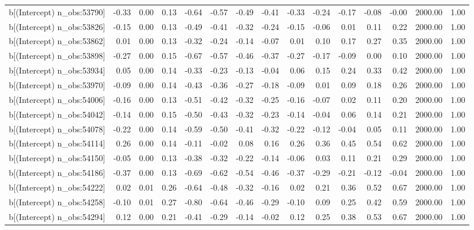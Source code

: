 \begin{table}[ht]
\begin{tabular}{rrrrrrrrrrrrrrr}
  b[(Intercept) n\_obs:53790] & -0.33 & 0.00 & 0.13 & -0.64 & -0.57 & -0.49 & -0.41 & -0.33 & -0.24 & -0.17 & -0.08 & -0.00 & 2000.00 & 1.00 \\ 
  b[(Intercept) n\_obs:53826] & -0.15 & 0.00 & 0.13 & -0.49 & -0.41 & -0.32 & -0.24 & -0.15 & -0.06 & 0.01 & 0.11 & 0.22 & 2000.00 & 1.00 \\ 
  b[(Intercept) n\_obs:53862] & 0.01 & 0.00 & 0.13 & -0.32 & -0.24 & -0.14 & -0.07 & 0.01 & 0.10 & 0.17 & 0.27 & 0.35 & 2000.00 & 1.00 \\ 
  b[(Intercept) n\_obs:53898] & -0.27 & 0.00 & 0.15 & -0.67 & -0.57 & -0.46 & -0.37 & -0.27 & -0.17 & -0.09 & 0.00 & 0.10 & 2000.00 & 1.00 \\ 
  b[(Intercept) n\_obs:53934] & 0.05 & 0.00 & 0.14 & -0.33 & -0.23 & -0.13 & -0.04 & 0.06 & 0.15 & 0.24 & 0.33 & 0.42 & 2000.00 & 1.00 \\ 
  b[(Intercept) n\_obs:53970] & -0.09 & 0.00 & 0.14 & -0.43 & -0.36 & -0.27 & -0.18 & -0.09 & 0.01 & 0.09 & 0.18 & 0.26 & 2000.00 & 1.00 \\ 
  b[(Intercept) n\_obs:54006] & -0.16 & 0.00 & 0.13 & -0.51 & -0.42 & -0.32 & -0.25 & -0.16 & -0.07 & 0.02 & 0.11 & 0.20 & 2000.00 & 1.00 \\ 
  b[(Intercept) n\_obs:54042] & -0.14 & 0.00 & 0.15 & -0.50 & -0.43 & -0.32 & -0.23 & -0.14 & -0.04 & 0.06 & 0.14 & 0.21 & 2000.00 & 1.00 \\ 
  b[(Intercept) n\_obs:54078] & -0.22 & 0.00 & 0.14 & -0.59 & -0.50 & -0.41 & -0.32 & -0.22 & -0.12 & -0.04 & 0.05 & 0.11 & 2000.00 & 1.00 \\ 
  b[(Intercept) n\_obs:54114] & 0.26 & 0.00 & 0.14 & -0.11 & -0.02 & 0.08 & 0.16 & 0.26 & 0.36 & 0.45 & 0.54 & 0.62 & 2000.00 & 1.00 \\ 
  b[(Intercept) n\_obs:54150] & -0.05 & 0.00 & 0.13 & -0.38 & -0.32 & -0.22 & -0.14 & -0.06 & 0.03 & 0.11 & 0.21 & 0.29 & 2000.00 & 1.00 \\ 
  b[(Intercept) n\_obs:54186] & -0.37 & 0.00 & 0.13 & -0.69 & -0.62 & -0.54 & -0.46 & -0.37 & -0.29 & -0.21 & -0.12 & -0.04 & 2000.00 & 1.00 \\ 
  b[(Intercept) n\_obs:54222] & 0.02 & 0.01 & 0.26 & -0.64 & -0.48 & -0.32 & -0.16 & 0.02 & 0.21 & 0.36 & 0.52 & 0.67 & 2000.00 & 1.00 \\ 
  b[(Intercept) n\_obs:54258] & -0.10 & 0.01 & 0.27 & -0.80 & -0.64 & -0.46 & -0.29 & -0.10 & 0.09 & 0.25 & 0.42 & 0.59 & 2000.00 & 1.00 \\ 
  b[(Intercept) n\_obs:54294] & 0.12 & 0.00 & 0.21 & -0.41 & -0.29 & -0.14 & -0.02 & 0.12 & 0.25 & 0.38 & 0.53 & 0.67 & 2000.00 & 1.00 \\ 

\end{tabular}
\end{table}
